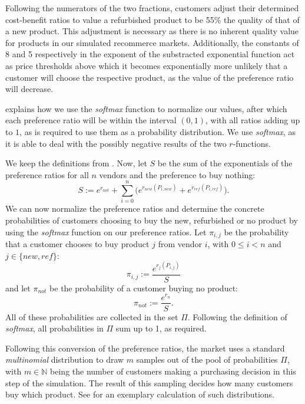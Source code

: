 Following the numerators of the two fractions, customers adjust their determined cost-benefit ratios to value a refurbished product to be 55\% the quality of that of a new product. This adjustment is necessary as there is no inherent quality value for products in our simulated recommerce markets. Additionally, the constants of 8 and 5 respectively in the exponent of the substracted exponential function act as price thresholds above which it becomes exponentially more unlikely that a customer will choose the respective product, as the value of the preference ratio will decrease.

 explains how we use the \emph{softmax} function to normalize our values, after which each preference ratio will be within the interval \((0,1)\), with all ratios adding up to \(1\), as is required to use them as a probability distribution. We use \emph{softmax}, as it is able to deal with the possibly negative results of the two \(r\)-functions.

\begin{definition}\label{def:customerSoftmax}
	We keep the definitions from . Now, let \(S\) be the sum of the exponentials of the preference ratios for all \(n\) vendors and the preference to buy nothing:
	\begin{equation}\label{eq:PrefSum}
		S := e^{r_{not}} + \sum_{i=0}^{n}\biggl(e^{r_{new}(P_{i, new})}+e^{r_{ref}(P_{i, ref})}\biggr).
	\end{equation}
	We can now normalize the preference ratios and determine the concrete probabilities of customers choosing to buy the new, refurbished or no product by using the \emph{softmax} function on our preference ratios. Let \(\pi_{i, j}\) be the probability that a customer chooses to buy product \(j\) from vendor \(i\), with \(0 \leq i < n\) and \(j \in \{new, ref\}\):
	\begin{equation}\label{eq:Softmax}
		\pi_{i, j} := \frac{e^{r_{j}(P_{i, j})}}{S}
	\end{equation}
	and let \(\pi_{not}\) be the probability of a customer buying no product:
	\begin{equation}
		\pi_{not} := \frac{e^{r_{n}}}{S}.
	\end{equation}
	All of these probabilities are collected in the set \(\Pi\). Following the definition of \emph{softmax}, all probabilities in \(\Pi\) sum up to 1, as required.
\end{definition}

Following this conversion of the preference ratios, the market uses a standard \emph{multinomial} distribution to draw \(m\) samples out of the pool of probabilities \(\Pi\), with \(m \in \mathbb{N}\) being the number of customers making a purchasing decision in this step of the simulation. The result of this sampling decides how many customers buy which product. See  for an exemplary calculation of such distributions.

